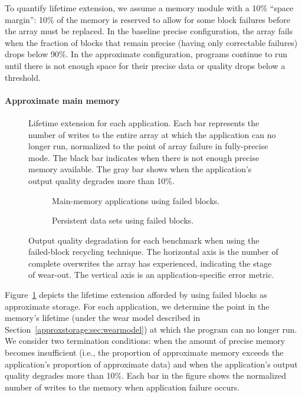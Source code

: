 To quantify lifetime extension, we assume a memory module with a 10\% ``space
margin'': 10\% of the memory is reserved to allow for some block
failures before the array must be replaced. In the baseline precise
configuration, the array fails when the fraction of blocks that remain
precise (having only correctable failures) drops below 90\%. In the approximate
configuration, programs continue to run until there is not enough space for
their precise data or quality drops below a threshold.

\paragraph{Approximate main memory}

\begin{figure}
    \centering
    
    \caption{
        Lifetime extension for each application.
    Each bar represents the number of writes to the entire array at
    which the application can no longer run,
    normalized to the point of array failure in fully-precise mode.
    The black bar indicates when there is not enough precise
    memory available. The gray bar shows when the application's
    output quality degrades more than 10\%.
    }
    \label{approxstorage:fig:extension}
\end{figure}

\begin{figure}
    \begin{subfigure}[b]{0.5\columnwidth}
        \centering
        
        \caption{
            Main-memory applications using failed blocks.
        }
        \label{approxstorage:fig:qos-p-tb}
    \end{subfigure}
    \begin{subfigure}[b]{0.5\columnwidth}
        \centering
        
        \caption{
            Persistent data sets using failed blocks.
        }
        \label{approxstorage:fig:nv-qos-tb}
    \end{subfigure}
    \caption{
        Output quality degradation for each benchmark when using the
        failed-block recycling technique. The horizontal axis is the number of
        complete overwrites the array has experienced, indicating the stage of
        wear-out. The vertical axis is an application-specific error metric.
    }
\end{figure}

Figure~\ref{approxstorage:fig:extension} depicts the lifetime extension afforded by
using failed blocks as approximate storage. For
each application, we determine the point in the memory's lifetime
(under the wear model described in Section~\ref{approxstorage:sec:wearmodel}) at
which the program can no longer run. We consider two termination
conditions: when the amount of
precise memory becomes insufficient (i.e., the proportion of
approximate memory exceeds the application's proportion of approximate
data) and when the application's output quality degrades more than 10\%. Each bar in
the figure shows the normalized number of writes to the memory when
application failure occurs.

